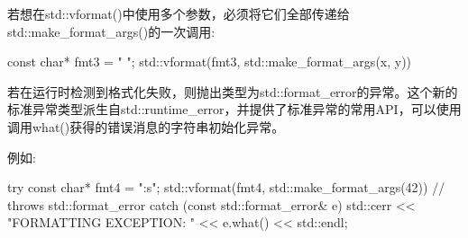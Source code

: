 若想在std::vformat()中使用多个参数，必须将它们全部传递给std::make\_format\_args()的一次调用:

\begin{cpp}
const char* fmt3 = "{} {}";
std::vformat(fmt3, std::make_format_args(x, y))
\end{cpp}

若在运行时检测到格式化失败，则抛出类型为std::format\_error的异常。这个新的标准异常类型派生自std::runtime\_error，并提供了标准异常的常用API，可以使用调用what()获得的错误消息的字符串初始化异常。

例如:

\begin{cpp}
try {
	const char* fmt4 = "{:s}";
	std::vformat(fmt4, std::make_format_args(42)) // throws std::format_error
}
catch (const std::format_error& e) {
	std::cerr << "FORMATTING EXCEPTION: " << e.what() << std::endl;
}
\end{cpp}

















